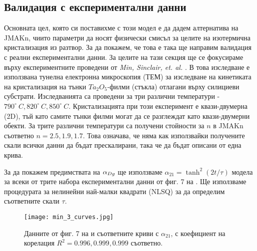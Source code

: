 \subsection{Валидация с експериментални данни}
\label{sub:experimental_validation}
Основната цел, която си поставихме с този модел е да дадем алтернатива на JMAKn, чиито параметри да носят физически смисъл за целите на изотермична кристализация из разтвор. За да покажем, че това е така ще направим валидация с реални експериментални данни.
За целите на тази секция ще се фокусираме върху експериментните проведени от \textit{Min, Sinclair, et. al.} \cite{Min2005}.  В  това изследване е използвана тунелна електронна микроскопия (ТЕМ) за изследване на кинетиката на кристализация на тънки $Ta_2O_5$-филми (стъкла) отлагани върху силициеви субстрати. Изследванията са проведени за три различни температури - $790^\circ~C, 820^\circ~C, 850^\circ~C$. Кристализацията при този експеримент е квази-двумерна (2D), тъй като самите тънки филми могат да се разглеждат като квази-двумерни обекти. За трите различни температури са получени стойности за $n$ в JMAKn съответно $n = 2.5, 1.9, 1.7$. Това означава, че няма как използвайки получените скали всички данни да бъдат прескалирани, така че да бъдат описани от една крива.

За да покажем предимствата на $\alpha_{Dg}$ ще използваме $\alpha_{21} = \tanh^2(2t/\tau)$ модела за всеки от трите набора експериментални данни от фиг. 7 на \cite{Min2005}. Ще използваме процедурата за нелинейни най-малки квадрати (NLSQ) за да определим съответните скали $\tau$.
\begin{figure}[hbpt]
    \centering
    \texttt{[image: min\_3\_curves.jpg]}
    \caption{Данните от фиг. 7 на \cite{Min2005} и съответните криви с $\alpha_{21}$, с коефициент на корелация $R^2 = 0.996, 0.999, 0.999$ съответно.}
    \label{fig:a21_min}
\end{figure}

